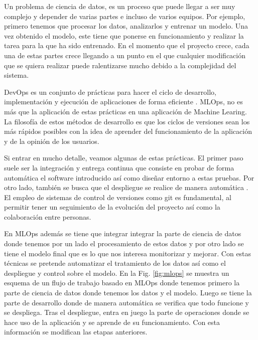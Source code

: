 \documentclass[a4paper,12pt,twoside,titlepage]{article}
\begin{document}
Un problema de ciencia de datos, es un proceso que puede llegar a ser muy complejo y depender de varias partes e incluso de varios equipos. Por ejemplo, primero tenemos que procesar los datos, analizarlos y entrenar un modelo. Una vez obtenido el modelo, este tiene que ponerse en funcionamiento y realizar la tarea para la que ha sido entrenado. En el momento que el proyecto crece, cada una de estas partes crece llegando a un punto en el que cualquier modificación que se quiera realizar puede ralentizarse mucho debido a la complejidad del sistema.

DevOps es un conjunto de prácticas para hacer el ciclo de desarrollo, implementación y ejecución de aplicaciones de forma eficiente \cite{mlops_nvidea}. MLOps, no es más que la aplicación de estas prácticas en una aplicación de Machine Learing. La filosofía de estos métodos de desarrollo es que los ciclos de versiones sean los más rápidos posibles con la idea de aprender del funcionamiento de la aplicación y de la opinión de los usuarios.

Si entrar en mucho detalle, veamos algunas de estas prácticas. El primer paso suele ser la integración y entrega continua que consiste en probar de forma automática el software introducido así como diseñar entorno a estas pruebas. Por otro lado, también se busca que el despliegue se realice de manera automática \cite{mlops_practical}. El empleo de sistemas de control de versiones como git es fundamental, al permitir tener un seguimiento de la evolución del proyecto así como la colaboración entre personas. 

En MLOps además se tiene que integrar integrar la parte de ciencia de datos donde tenemos por un lado el procesamiento de estos datos y por otro lado se tiene el modelo final que es lo que nos interesa monitorizar y mejorar. Con estas técnicas se pretende automatizar el tratamiento de los datos así como el despliegue y control sobre el modelo. En la Fig. \ref{fig:mlops} se muestra un esquema de un flujo de trabajo basado en MLOps donde tenemos primero la parte de ciencia de datos donde tenemos los datos y el modelo. Luego se tiene la parte de desarrollo donde de manera automática se verifica que todo funcione y se despliega. Tras el despliegue, entra en juego la parte de operaciones donde se hace uso de la aplicación y se aprende de su funcionamiento. Con esta información se modifican las etapas anteriores.
\end{document}
